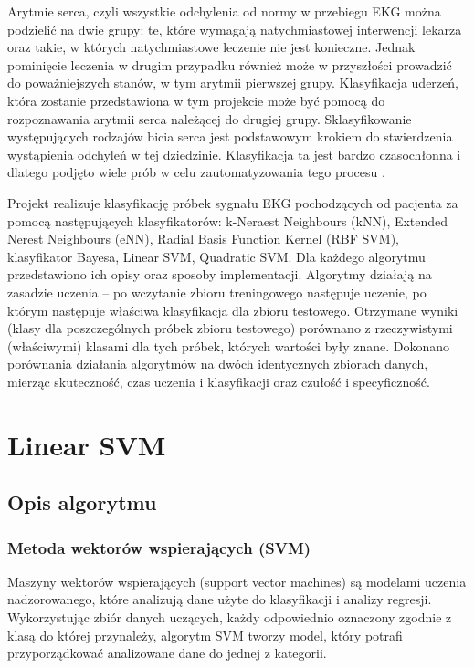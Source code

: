 \documentclass[[10pt,a4paper]{article}
\begin{document}
 Arytmie serca, czyli wszystkie odchylenia od normy w przebiegu EKG można podzielić na dwie grupy: te, które wymagają natychmiastowej interwencji lekarza oraz takie, 
w których natychmiastowe leczenie nie jest konieczne. Jednak pominięcie leczenia w drugim przypadku również może w przyszłości prowadzić do poważniejszych stanów, w tym arytmii pierwszej grupy. 
Klasyfikacja uderzeń, która zostanie przedstawiona w tym projekcie może być pomocą do rozpoznawania arytmii serca należącej do drugiej grupy. Sklasyfikowanie występujących rodzajów bicia serca jest podstawowym krokiem do stwierdzenia wystąpienia odchyleń w tej dziedzinie. Klasyfikacja ta jest bardzo czasochłonna i dlatego podjęto wiele prób w celu zautomatyzowania tego procesu . 


 	Projekt realizuje klasyfikację próbek sygnału EKG pochodzących od pacjenta za pomocą następujących klasyfikatorów: k-Neraest Neighbours (kNN), Extended Nerest Neighbours (eNN), Radial Basis Function Kernel (RBF SVM), klasyfikator Bayesa, Linear SVM, Quadratic SVM. Dla każdego algorytmu przedstawiono ich opisy oraz sposoby implementacji. Algorytmy działają na zasadzie uczenia – po wczytanie zbioru treningowego następuje uczenie, po którym następuje właściwa klasyfikacja dla zbioru testowego. Otrzymane wyniki (klasy dla poszczególnych próbek zbioru testowego) porównano z rzeczywistymi (właściwymi) klasami dla tych próbek, których wartości były znane. Dokonano porównania działania algorytmów na dwóch identycznych zbiorach danych, mierząc skuteczność, czas uczenia i klasyfikacji oraz czułość i specyficzność. 
 	\newpage

\section{Linear SVM}
\subsection{Opis algorytmu}
\vspace{5mm}
\subsubsection{Metoda wektorów wspierających (SVM)}
\vspace{5mm}


Maszyny wektorów wspierających (support vector machines) są modelami uczenia nadzorowanego, które analizują dane użyte do klasyfikacji i analizy regresji.
 Wykorzystując zbiór danych uczących, każdy odpowiednio oznaczony zgodnie z klasą do której przynależy, algorytm SVM tworzy model, który potrafi
przyporządkować analizowane dane do jednej z kategorii. 
\vspace{5mm}
\end{document}
